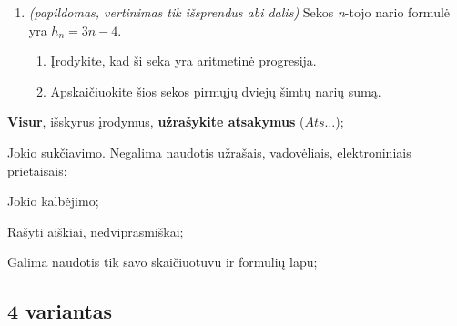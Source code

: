 \documentclass[a4paper]{article}
\begin{document}
\begin{enumerate}
      \item \textit{(papildomas, vertinimas tik išsprendus abi dalis)} Sekos
            \textit{n}-tojo nario formulė yra
            $h_{n} = 3n-4$. 
            \begin{enumerate}[label= (\alph*)]
                  \item Įrodykite, kad ši seka yra aritmetinė progresija.
                  \item Apskaičiuokite šios sekos pirmųjų dviejų šimtų narių
                        sumą.
            \end{enumerate}
\end{enumerate}

\begin{small}
      \begin{enumerate*}[label={(\arabic*)}]
            \item \textbf{Visur}, išskyrus įrodymus, \textbf{užrašykite
                  atsakymus} ($Ats\ldots$);
            \item Jokio sukčiavimo. Negalima naudotis užrašais, vadovėliais,
            elektroniniais prietaisais;
            \item Jokio kalbėjimo;
            \item Rašyti aiškiai, nedviprasmiškai;
            \item Galima naudotis tik savo skaičiuotuvu ir formulių lapu;
      \end{enumerate*}
\end{small}

\subsection*{4 variantas}
\end{document}

